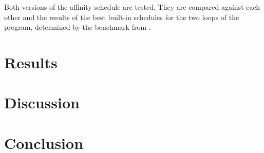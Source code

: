 \documentclass[twoside,11pt]{article}
\begin{document}
Both versions of the affinity schedule are tested. They
are compared against each other and the results of the best
built-in schedules for the two loops of the program,
determined by the benchmark from \citet{b1}.


\section{Results} %


\section{Discussion} %


\section{Conclusion} %



\end{document}
